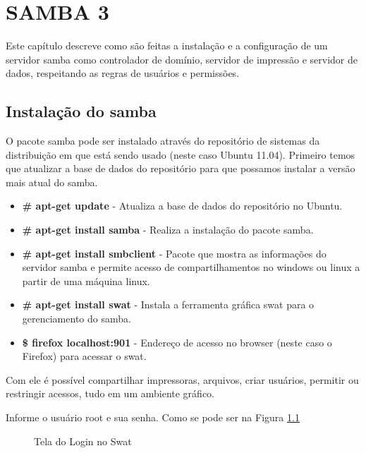 \chapter{SAMBA 3}
Este capítulo descreve como são feitas a instalação e a configuração de um servidor samba como controlador de domínio, servidor de impressão e servidor de dados, respeitando as regras de usuários e permissões.

\section{Instalação do samba}

O pacote samba pode ser instalado através do repositório de sistemas da distribuição em que está sendo usado (neste caso Ubuntu 11.04). Primeiro temos que atualizar a base de dados do repositório para que possamos instalar a versão mais atual do samba.

\begin{itemize}
    \item \textbf{\# apt-get update} - Atualiza a base de dados do repositório no Ubuntu.
    \item \textbf{\# apt-get install samba} - Realiza a instalação do pacote samba.
    \item \textbf{\# apt-get install smbclient} - Pacote que mostra as informações do servidor samba e permite acesso de compartilhamentos no windows ou linux a partir de uma máquina linux.
    \item \textbf{\# apt-get install swat} - Instala a ferramenta gráfica swat para o gerenciamento do samba.
    \item \textbf{\$ firefox localhost:901} - Endereço de acesso no browser (neste caso o Firefox) para acessar o swat.
\end{itemize}

Com ele é possível compartilhar impressoras, arquivos, criar usuários, permitir ou restringir acessos, tudo em um ambiente gráfico.

Informe o usuário root e sua senha. Como se pode ser na Figura \ref{swat_login}

\begin{figure}[hp]
   	\centering
   	\caption{Tela do Login no Swat}
    \label{swat_login}
\end{figure}


